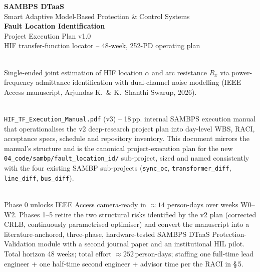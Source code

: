 \documentclass[11pt,a4paper]{article}
\begin{document}
\begin{titlepage}
\thispagestyle{empty}
\noindent\colorbox{sambpblue}{\parbox{\dimexpr\textwidth-2\fboxsep\relax}{%
  \vspace{0.6cm}
  \color{white}\Large\textbf{SAMBPS DTaaS}\\[2pt]
  \color{sambplight}\normalsize Smart Adaptive Model-Based Protection \& Control Systems\\[1.2cm]
  \color{white}\Huge\textbf{Fault Location Identification}\\[6pt]
  \color{sambplight}\Large Project Execution Plan v1.0\\[6pt]
  \color{white}\large HIF transfer-function locator -- 48-week, 252-PD operating plan
  \vspace{0.4cm}
}}

\vspace{1.6cm}

\\[3pt]
\noindent
Single-ended joint estimation of HIF location $\alpha$ and arc resistance $R_x$
via power-frequency admittance identification with dual-channel noise modelling
(IEEE Access manuscript, Arjundas K.\ \& K.\ Shanthi Swarup, 2026).

\vspace{0.7cm}

\\[3pt]
\noindent
\texttt{HIF\_TF\_Execution\_Manual.pdf} (v3) -- 18\,pp. internal SAMBPS execution
manual that operationalises the v2 deep-research project plan into day-level
WBS, RACI, acceptance specs, schedule and repository inventory.  This document
mirrors the manual's structure and is the canonical project-execution plan for
the new \texttt{04\_code/sambp/fault\_location\_id/} sub-project, sized and
named consistently with the four existing SAMBP sub-projects
(\texttt{sync\_oc}, \texttt{transformer\_diff}, \texttt{line\_diff},
\texttt{bus\_diff}).

\vspace{0.7cm}

\\[3pt]
\noindent
Phase 0 unlocks IEEE Access camera-ready in $\approx 14$ person-days over weeks
W0--W2.  Phases 1--5 retire the two structural risks identified by the v2 plan
(corrected CRLB, continuously parametrised optimiser) and convert the
manuscript into a literature-anchored, three-phase, hardware-tested SAMBPS
DTaaS Protection-Validation module with a second journal paper and an
institutional HIL pilot.  Total horizon 48 weeks; total effort
$\approx 252$\,person-days; staffing one full-time lead engineer + one
half-time second engineer + advisor time per the RACI in \S\,5.


\end{titlepage}
\end{document}
